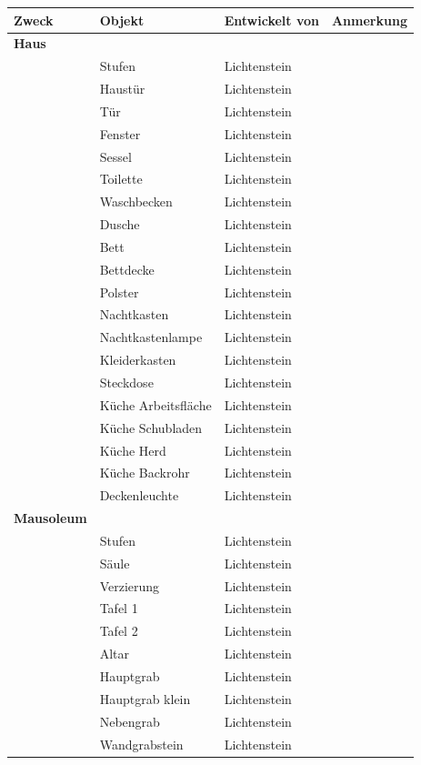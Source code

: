 \begin{tabular}{l|l|l|l}
    \textbf{Zweck} & \textbf{Objekt} & \textbf{Entwickelt von} & \textbf{Anmerkung} \\
    \hline
    \textbf{Haus} &  &  & \\
    \hline
    & Stufen & Lichtenstein & \\
    & Haustür & Lichtenstein & \\
    & Tür & Lichtenstein & \\
    & Fenster & Lichtenstein & \\
    & Sessel & Lichtenstein & \\
    & Toilette & Lichtenstein & \\
    & Waschbecken & Lichtenstein & \\
    & Dusche & Lichtenstein & \\
    & Bett & Lichtenstein & \\
    & Bettdecke & Lichtenstein & \\
    & Polster & Lichtenstein & \\
    & Nachtkasten & Lichtenstein & \\
    & Nachtkastenlampe & Lichtenstein & \\
    & Kleiderkasten & Lichtenstein & \\
    & Steckdose & Lichtenstein & \\
    & Küche Arbeitsfläche & Lichtenstein & \\
    & Küche Schubladen & Lichtenstein & \\
    & Küche Herd & Lichtenstein & \\
    & Küche Backrohr & Lichtenstein & \\
    & Deckenleuchte & Lichtenstein & \\
    \hline
    \textbf{Mausoleum} &  &  & \\
    \hline
    & Stufen & Lichtenstein & \\
    & Säule & Lichtenstein & \\
    & Verzierung & Lichtenstein & \\
    & Tafel 1 & Lichtenstein & \\
    & Tafel 2 & Lichtenstein & \\
    & Altar & Lichtenstein & \\
    & Hauptgrab & Lichtenstein & \\
    & Hauptgrab klein & Lichtenstein & \\
    & Nebengrab & Lichtenstein & \\
    & Wandgrabstein & Lichtenstein & \\

\end{tabular}
